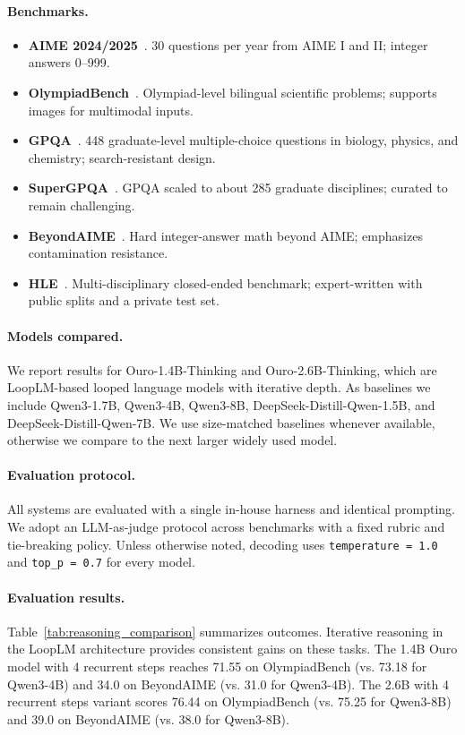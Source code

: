 \documentclass[]{bytedance_seed}
\newcommand{\1}{\mathbf{1}}
\newcommand{\ut}{LoopLM}
\begin{document}
\paragraph{Benchmarks.}
\begin{itemize}
  \item \textbf{AIME 2024/2025}~\cite{HuggingFaceH4_2024_AIME2024}. 30 questions per year from AIME I and II; integer answers 0--999.
  \item \textbf{OlympiadBench}~\cite{He2024OlympiadBench}. Olympiad-level bilingual scientific problems; supports images for multimodal inputs.
  \item \textbf{GPQA}~\cite{rein2023gpqa}. 448 graduate-level multiple-choice questions in biology, physics, and chemistry; search-resistant design.
  \item \textbf{SuperGPQA}~\cite{MAPTeam2025SuperGPQA}. GPQA scaled to about 285 graduate disciplines; curated to remain challenging.
  \item \textbf{BeyondAIME}~\cite{ByteDanceSeed_2025_BeyondAIME}. Hard integer-answer math beyond AIME; emphasizes contamination resistance.
  \item \textbf{HLE}~\cite{Phan2025HLE}. Multi-disciplinary closed-ended benchmark; expert-written with public splits and a private test set.
\end{itemize}

\paragraph{Models compared.}
We report results for Ouro-1.4B-Thinking and Ouro-2.6B-Thinking, which are \ut{}-based looped language models with iterative depth. As baselines we include Qwen3-1.7B, Qwen3-4B, Qwen3-8B, DeepSeek-Distill-Qwen-1.5B, and DeepSeek-Distill-Qwen-7B. We use size-matched baselines whenever available, otherwise we compare to the next larger widely used model.

\paragraph{Evaluation protocol.}
All systems are evaluated with a single in-house harness and identical prompting. We adopt an LLM-as-judge protocol across benchmarks with a fixed rubric and tie-breaking policy. Unless otherwise noted, decoding uses \texttt{temperature = 1.0} and \texttt{top\_p = 0.7} for every model.



\paragraph{Evaluation results.}
Table~\ref{tab:reasoning_comparison} summarizes outcomes. Iterative reasoning in the \ut{} architecture provides consistent gains on these tasks. The 1.4B Ouro model with 4 recurrent steps reaches 71.55 on OlympiadBench (vs. 73.18 for Qwen3-4B) and 34.0 on BeyondAIME (vs. 31.0 for Qwen3-4B). The 2.6B with 4 recurrent steps variant scores 76.44 on OlympiadBench (vs. 75.25 for Qwen3-8B) and 39.0 on BeyondAIME (vs. 38.0 for Qwen3-8B).
\end{document}
